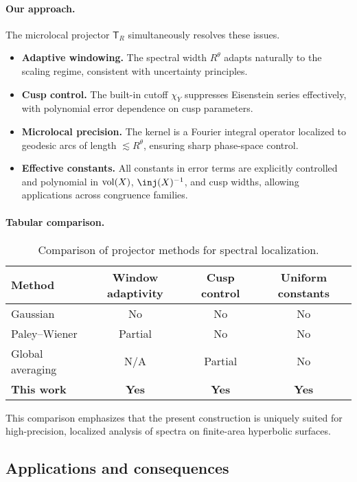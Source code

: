 \paragraph{Our approach.}
The microlocal projector $\mathsf{T}_R$ simultaneously resolves these issues.  
\begin{itemize}
  \item \textbf{Adaptive windowing.} The spectral width $R^\theta$ adapts naturally to the
        scaling regime, consistent with uncertainty principles.  
  \item \textbf{Cusp control.} The built-in cutoff $\chi_Y$ suppresses Eisenstein series
        effectively, with polynomial error dependence on cusp parameters.  
  \item \textbf{Microlocal precision.} The kernel is a Fourier integral operator localized
        to geodesic arcs of length $\lesssim R^\theta$, ensuring sharp phase-space control.  
  \item \textbf{Effective constants.} All constants in error terms are explicitly controlled
        and polynomial in $\operatorname{vol}(X)$, $\inj(X)^{-1}$, and cusp widths, allowing applications
        across congruence families.  
\end{itemize}

\paragraph{Tabular comparison.}
\begin{table}[h]
\centering
\begin{tabular}{l|c|c|c}
\textbf{Method} & \textbf{Window adaptivity} & \textbf{Cusp control} & \textbf{Uniform constants} \\
\hline
Gaussian & No & No & No \\
Paley–Wiener & Partial & No & No \\
Global averaging & N/A & Partial & No \\
\textbf{This work} & \textbf{Yes} & \textbf{Yes} & \textbf{Yes} \\
\end{tabular}
\caption{\label{tab:comparison}Comparison of projector methods for spectral localization.}
\end{table}

This comparison emphasizes that the present construction is uniquely suited for
high-precision, localized analysis of spectra on finite-area hyperbolic surfaces.

\subsection{Applications and consequences}\label{subsec:applications}

